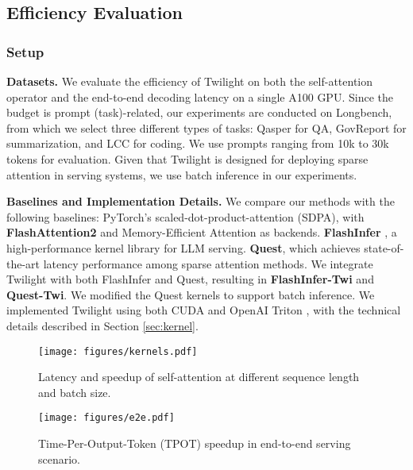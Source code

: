 \subsection{Efficiency Evaluation}

\subsubsection{Setup}
\textbf{Datasets.} We evaluate the efficiency of Twilight on both the self-attention operator and the end-to-end decoding latency on a single A100 GPU. Since the budget is prompt (task)-related, our experiments are conducted on Longbench, from which we select three different types of tasks: Qasper \cite{dasigi2021dataset} for QA, GovReport \cite{huang2021efficient} for summarization, and LCC \cite{guo2023longcoder} for coding. We use prompts ranging from 10k to 30k tokens for evaluation. Given that Twilight is designed for deploying sparse attention in serving systems, we use batch inference in our experiments.

\textbf{Baselines and Implementation Details.} We compare our methods with the following baselines:
PyTorch's scaled-dot-product-attention (SDPA), with \textbf{FlashAttention2} \cite{dao2023flashattention2} and Memory-Efficient Attention \cite{xFormers2022} as backends.
\textbf{FlashInfer} \cite{ye2025flashinfer}, a high-performance kernel library for LLM serving.
\textbf{Quest}, which achieves state-of-the-art latency performance among sparse attention methods.
We integrate Twilight with both FlashInfer and Quest, resulting in \textbf{FlashInfer-Twi} and \textbf{Quest-Twi}. We modified the Quest kernels to support batch inference. We implemented Twilight using both CUDA and OpenAI Triton \cite{tillet2019triton}, with the technical details described in Section \ref{sec:kernel}.

\begin{figure*}[t]
\begin{center}
\centerline{\texttt{[image: figures/kernels.pdf]}}
\caption{Latency and speedup of self-attention at different sequence length and batch size.}
\label{fig:kernel}
\end{center}
\end{figure*}

\begin{figure*}[t]
\begin{center}
\centerline{\texttt{[image: figures/e2e.pdf]}}
\caption{Time-Per-Output-Token (TPOT) speedup in end-to-end serving scenario.}
\label{fig:e2e}
\end{center}
\end{figure*}

